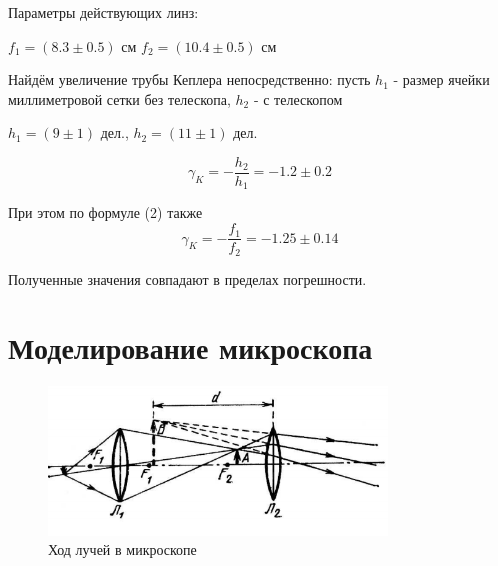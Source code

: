 \documentclass[a4paper,12pt]{article}
\begin{document}
\begin{enumerate}
Параметры действующих линз:
\begin{center}
    $ f_1 = (8.3\pm0.5) $ см \hspace{1cm} $f_2 = (10.4\pm0.5) $ см
\end{center}

Найдём увеличение трубы Кеплера непосредственно: пусть $h_1$ - размер ячейки миллиметровой сетки без телескопа, $h_2$ - с телескопом
\begin{center}
$h_1 = (9 \pm 1)$ дел., \hspace{1cm} $h_2 = (11 \pm 1)$ дел.
\end{center}
\[\boxed{\gamma_K = -\frac{h_2}{h_1} = -1.2 \pm 0.2} \]

При этом по формуле (2) также
    \[ \boxed{\gamma_K = -\frac{f_1}{f_2} = -1.25 \pm 0.14} \] 


Полученные значения совпадают в пределах погрешности.
\end{enumerate}

\section*{Моделирование микроскопа}

\begin{figure}[h]
    \centering
    \includegraphics[width=9cm]{micro.PNG}
    \caption{Ход лучей в микроскопе}
\end{figure}
\end{document}
